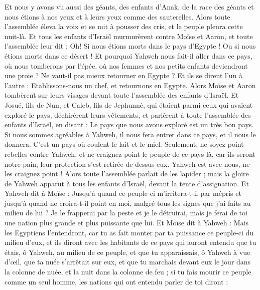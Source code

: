 \begin{multicols}{2}
Et nous y avons vu aussi des géants, des enfants d'Anak, de la race des géants et nous étions à nos yeux et à leurs yeux comme des sauterelles.
\VerseOne{}Alors toute l'assemblée éleva la voix et se mit à pousser des cris, et le peuple pleura cette nuit-là.
Et tous les enfants d'Israël murmurèrent contre Moïse et Aaron, et toute l'assemblée leur dit : Oh! Si nous étions morts dans le pays d'Egypte ! Ou si nous étions morts dans ce désert !
Et pourquoi Yahweh nous fait-il aller dans ce pays, où nous tomberons par l'épée, où nos femmes et nos petits enfants deviendront une proie ? Ne vaut-il pas mieux retourner en Egypte ?
Et ils se dirent l'un à l'autre : Etablissons-nous un chef, et retournons en Egypte.
Alors Moïse et Aaron tombèrent sur leurs visages devant toute l'assemblée des enfants d'Israël.
Et Josué, fils de Nun, et Caleb, fils de Jephunné, qui étaient parmi ceux qui avaient exploré le pays, déchirèrent leurs vêtements,
et parlèrent à toute l'assemblée des enfants d'Israël, en disant : Le pays que nous avons exploré est un très bon pays.
Si nous sommes agréables à Yahweh, il nous fera entrer dans ce pays, et il nous le donnera. C'est un pays où coulent le lait et le miel.
Seulement, ne soyez point rebelles contre Yahweh, et ne craignez point le peuple de ce pays-là, car ils seront notre pain, leur protection s'est retirée de dessus eux. Yahweh est avec nous, ne les craignez point !
Alors toute l'assemblée parlait de les lapider ; mais la gloire de Yahweh apparut à tous les enfants d'Israël, devant la tente d'assignation.
Et Yahweh dit à Moïse : Jusqu'à quand ce peuple-ci m'irritera-t-il par mépris et jusqu'à quand ne croira-t-il point en moi, malgré tous les signes que j'ai faits au milieu de lui ?
Je le frapperai par la peste et je le détruirai, mais je ferai de toi une nation plus grande et plus puissante que lui.
Et Moïse dit à Yahweh : Mais les Egyptiens l'entendront, car tu as fait monter par ta puissance ce peuple-ci du milieu d'eux,
et ils diront avec les habitants de ce pays qui auront entendu que tu étais, ô Yahweh, au milieu de ce peuple, et que tu apparaissais, ô Yahweh à vue d'œil, que ta nuée s'arrêtait sur eux, et que tu marchais devant eux le jour dans la colonne de nuée, et la nuit dans la colonne de feu ;
si tu fais mourir ce peuple comme un seul homme, les nations qui ont entendu parler de toi diront :

\end{multicols}
